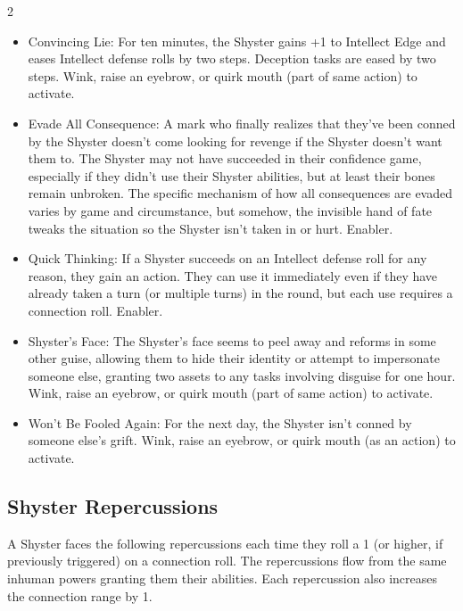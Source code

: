 \begin{multicols}{2}
\begin{itemize} 
\item Convincing Lie: For ten minutes, the Shyster gains +1 to Intellect Edge and eases Intellect defense rolls by two steps. Deception tasks are eased by two steps. Wink, raise an eyebrow, or quirk mouth (part of same action) to activate.
\item Evade All Consequence: A mark who finally realizes that they’ve been conned by the Shyster doesn’t come looking for revenge if the Shyster doesn’t want them to. The Shyster may not have succeeded in their confidence game, especially if they didn’t use their Shyster abilities, but at least their bones remain unbroken. The specific mechanism of how all consequences are evaded varies by game and circumstance, but somehow, the invisible hand of fate tweaks the situation so the Shyster isn’t taken in or hurt. Enabler.
\item Quick Thinking: If a Shyster succeeds on an Intellect defense roll for any reason, they gain an action. They can use it immediately even if they have already taken a turn (or multiple turns) in the round, but each use requires a connection roll. Enabler. 
\item Shyster’s Face: The Shyster’s face seems to peel away and reforms in some other guise, allowing them to hide their identity or attempt to impersonate someone else, granting two assets to any tasks involving disguise for one hour. Wink, raise an eyebrow, or quirk mouth (part of same action) to activate.
\item Won’t Be Fooled Again: For the next day, the Shyster isn’t conned by someone else’s grift. Wink, raise an eyebrow, or quirk mouth (as an action) to activate. 
\end{itemize}

\subsection{Shyster Repercussions}
A Shyster faces the following repercussions each time they roll a 1 (or higher, if previously triggered) on a connection roll. The repercussions flow from the same inhuman powers granting them their abilities. Each repercussion also increases the connection range by 1.

\end{multicols}

\onecolumn
\clearpage

